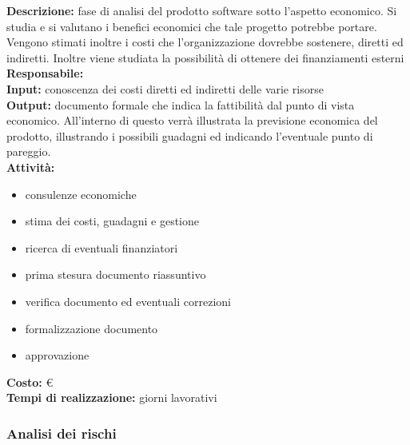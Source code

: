 \textbf{Descrizione:} fase di analisi del prodotto software sotto l'aspetto economico. Si studia
e si valutano i benefici economici che tale progetto potrebbe portare. Vengono stimati
inoltre i costi che l'organizzazione dovrebbe sostenere, diretti ed indiretti. Inoltre viene
studiata la possibilità di ottenere dei finanziamenti esterni \\
\linebreak
\textbf{Responsabile:} \\
\linebreak
\textbf{Input:} conoscenza dei costi diretti ed indiretti delle varie risorse \\
\linebreak
\textbf{Output:} documento formale che indica la fattibilità dal punto di vista economico.
All’interno di questo verrà illustrata la previsione economica del prodotto, illustrando i
possibili guadagni ed indicando l'eventuale punto di pareggio.\\
\linebreak
\textbf{Attività:}
\begin{itemize}
\item consulenze economiche
\item stima dei costi, guadagni e gestione
\item ricerca di eventuali finanziatori
\item prima stesura documento riassuntivo
\item verifica documento ed eventuali correzioni
\item formalizzazione documento
\item approvazione
\end{itemize}
\textbf{Costo:} \euro \\
\textbf{Tempi di realizzazione:}  giorni lavorativi


\subsubsection{Analisi dei rischi}

